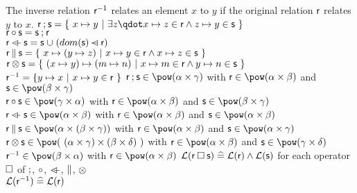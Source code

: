 \begin{samepage}
\begin{rodinrefentry}
    The inverse relation $\textsf{r}^{-1}$ relates an element $x$ to $y$ if the original relation $\textsf{r}$
    relates $y$ to $x$.
  \rrdef
    $\exprlr\fcomp\exprls = \{~x \mapsto y~|~\exists z\qdot x \mapsto z \in\exprlr \land z \mapsto y \in\exprls~\}$\\
    $\textsf{r}\circ\textsf{s} = \textsf{s}\mathbin;\textsf{r}$\\
    $\textsf{r}\mathbin{\lhd\mkern-9mu-}\textsf{s} = \textsf{s}\mathbin{\mkern1mu\cup\mkern1mu} (dom(\textsf{s})\mathbin{\lhd\mkern-14mu-}\textsf{r})$\\
    $\textsf{r}\mathbin\|\textsf{s} = \{~x\mapsto(y\mapsto z)~|~x\mapsto y\in\textsf{r} \land x\mapsto z\in\textsf{s} ~\}$\\
    $\textsf{r}\mathbin\otimes\textsf{s} = \{~(x\mapsto y)\mapsto(m\mapsto n)~|~x\mapsto m\in\textsf{r}\land y\mapsto n\in\textsf{s} ~\}$\\
    $\textsf{r}^{-1} = \{y\mapsto x~|~x\mapsto y\in\textsf{r}~\}$
  \rrtypes
    $\exprlr\fcomp\exprls\in\pow(\alpha\cprod\gamma)$ with $\exprlr\in\pow(\alpha\cprod\beta)$ and
      $\exprls\in\pow(\beta\cprod\gamma)$\\
    $\exprlr\bcomp\exprls\in\pow(\gamma\cprod\alpha)$ with $\exprlr\in\pow(\alpha\cprod\beta)$ and
      $\exprls\in\pow(\beta\cprod\gamma)$\\
    $\exprlr\ovl\exprls\in\pow(\alpha\cprod\beta)$ with $\exprlr\in\pow(\alpha\cprod\beta)$ and
      $\exprls\in\pow(\alpha\cprod\beta)$\\
    $\exprlr\pprod\exprls\in\pow(\alpha\cprod(\beta\cprod\gamma))$ with $\exprlr\in\pow(\alpha\cprod\beta)$ and
      $\exprls\in\pow(\alpha\cprod\gamma)$\\
    $\exprlr\dprod\exprls\in\pow(~(\alpha\cprod\gamma)\cprod(\beta\cprod\delta)~)$ with
      $\exprlr\in\pow(\alpha\cprod\beta)$ and
      $\exprls\in\pow(\gamma\cprod\delta)$\\
    $\exprlr^{-1}\in\pow(\beta\cprod\alpha)$ with $\exprlr\in\pow(\alpha\cprod\beta)$
  \rrwd
    $\mathcal{L}(\textsf{r}\mathbin{\Box}\textsf{s})\mathrel{\widehat=}\mathcal{L}(\textsf{r})\land\mathcal{L}(\textsf{s})$ for each operator $\mathbin{\Box}$ of
    $\mathbin;$, $\circ$, $\mathbin{\lhd\mkern-9mu-}$, $\mathbin\|$, $\mathbin\otimes$\\
    $\mathcal{L}(\textsf{r}^{-1})\mathrel{\widehat=}\mathcal{L}(\textsf{r})$
\end{rodinrefentry}
\end{samepage}

